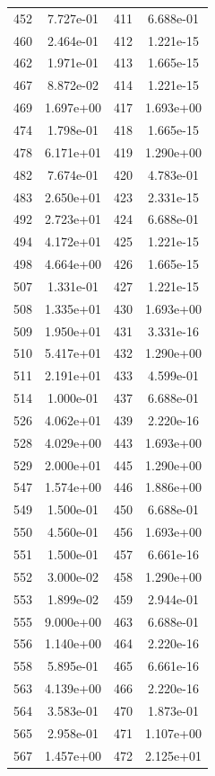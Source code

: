 \documentclass[12pt]{article}
\begin{document}
\begin{longtable}{@{}cccc@{}}
452 & 7.727e-01 & 411 & 6.688e-01 \\
460 & 2.464e-01 & 412 & 1.221e-15 \\
462 & 1.971e-01 & 413 & 1.665e-15 \\
467 & 8.872e-02 & 414 & 1.221e-15 \\
469 & 1.697e+00 & 417 & 1.693e+00 \\
474 & 1.798e-01 & 418 & 1.665e-15 \\
478 & 6.171e+01 & 419 & 1.290e+00 \\
482 & 7.674e-01 & 420 & 4.783e-01 \\
483 & 2.650e+01 & 423 & 2.331e-15 \\
492 & 2.723e+01 & 424 & 6.688e-01 \\
494 & 4.172e+01 & 425 & 1.221e-15 \\
498 & 4.664e+00 & 426 & 1.665e-15 \\
507 & 1.331e-01 & 427 & 1.221e-15 \\
508 & 1.335e+01 & 430 & 1.693e+00 \\
509 & 1.950e+01 & 431 & 3.331e-16 \\
510 & 5.417e+01 & 432 & 1.290e+00 \\
511 & 2.191e+01 & 433 & 4.599e-01 \\
514 & 1.000e-01 & 437 & 6.688e-01 \\
526 & 4.062e+01 & 439 & 2.220e-16 \\
528 & 4.029e+00 & 443 & 1.693e+00 \\
529 & 2.000e+01 & 445 & 1.290e+00 \\
547 & 1.574e+00 & 446 & 1.886e+00 \\
549 & 1.500e-01 & 450 & 6.688e-01 \\
550 & 4.560e-01 & 456 & 1.693e+00 \\
551 & 1.500e-01 & 457 & 6.661e-16 \\
552 & 3.000e-02 & 458 & 1.290e+00 \\
553 & 1.899e-02 & 459 & 2.944e-01 \\
555 & 9.000e+00 & 463 & 6.688e-01 \\
556 & 1.140e+00 & 464 & 2.220e-16 \\
558 & 5.895e-01 & 465 & 6.661e-16 \\
563 & 4.139e+00 & 466 & 2.220e-16 \\
564 & 3.583e-01 & 470 & 1.873e-01 \\
565 & 2.958e-01 & 471 & 1.107e+00 \\
567 & 1.457e+00 & 472 & 2.125e+01 \\

\end{longtable}
\end{document}
